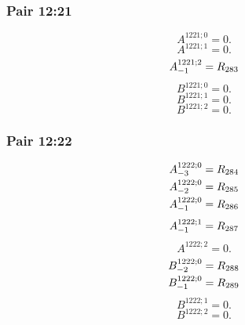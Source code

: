 \documentclass[11pt,a4paper]{article}
\begin{document}
\subsubsection{Pair 12:21}
\begin{equation}
A^{1221;0}=0.
\label{eq:cat-map-312}
\end{equation}
\begin{equation}
A^{1221;1}=0.
\label{eq:cat-map-313}
\end{equation}
\begin{equation}
\shortstack[l]{$\displaystyle A^{1221;2}_{-1}=R_{283}$}
\label{eq:cat-map-314}
\end{equation}
\begin{equation}
B^{1221;0}=0.
\label{eq:cat-map-315}
\end{equation}
\begin{equation}
B^{1221;1}=0.
\label{eq:cat-map-316}
\end{equation}
\begin{equation}
B^{1221;2}=0.
\label{eq:cat-map-317}
\end{equation}
\subsubsection{Pair 12:22}
\begin{equation}
\shortstack[l]{$\displaystyle A^{1222;0}_{-3}=R_{284}$\\
$\displaystyle A^{1222;0}_{-2}=R_{285}$\\
$\displaystyle A^{1222;0}_{-1}=R_{286}$}
\label{eq:cat-map-318}
\end{equation}
\begin{equation}
\shortstack[l]{$\displaystyle A^{1222;1}_{-1}=R_{287}$}
\label{eq:cat-map-319}
\end{equation}
\begin{equation}
A^{1222;2}=0.
\label{eq:cat-map-320}
\end{equation}
\begin{equation}
\shortstack[l]{$\displaystyle B^{1222;0}_{-2}=R_{288}$\\
$\displaystyle B^{1222;0}_{-1}=R_{289}$}
\label{eq:cat-map-321}
\end{equation}
\begin{equation}
B^{1222;1}=0.
\label{eq:cat-map-322}
\end{equation}
\begin{equation}
B^{1222;2}=0.
\label{eq:cat-map-323}
\end{equation}
\end{document}

